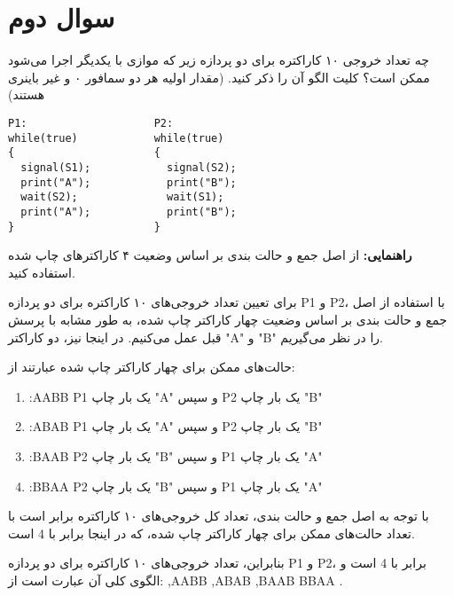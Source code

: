\section{سوال دوم}

چه تعداد خروجی ۱۰ کاراکتره برای دو پردازه زیر که موازی با یکدیگر اجرا می‌شود ممکن است؟ کلیت الگو آن را ذکر کنید. (مقدار اولیه هر دو سمافور ۰ و غیر باینری هستند)


\begin{latin}
\begin{lstlisting}
P1:                    P2:
while(true)            while(true)
{                      {
  signal(S1);            signal(S2);
  print("A");            print("B");
  wait(S2);              wait(S1);
  print("A");            print("B");
}	                   }

\end{lstlisting}
\end{latin}

\textbf{راهنمایی:‌ }از اصل جمع و حالت بندی بر اساس وضعیت ۴ کاراکتر‌های چاپ شده استفاده کنید.

\begin{qsolve}
برای تعیین تعداد خروجی‌های ۱۰ کاراکتره برای دو پردازه P1 و P2، با استفاده از اصل جمع و حالت بندی بر اساس وضعیت چهار کاراکتر چاپ شده، به طور مشابه با پرسش قبل عمل می‌کنیم. در اینجا نیز، دو کاراکتر "A" و "B" را در نظر می‌گیریم.

حالت‌های ممکن برای چهار کاراکتر چاپ شده عبارتند از:
\begin{enumerate}
	\item :AABB P1 یک بار چاپ "A" و سپس P2 یک بار چاپ "B"
	\item :ABAB P1 یک بار چاپ "A" و سپس P2 یک بار چاپ "B"
	\item :BAAB P2 یک بار چاپ "B" و سپس P1 یک بار چاپ "A"
	\item :BBAA P2 یک بار چاپ "B" و سپس P1 یک بار چاپ "A"
\end{enumerate}

با توجه به اصل جمع و حالت بندی، تعداد کل خروجی‌های ۱۰ کاراکتره برابر است با تعداد حالت‌های ممکن برای چهار کاراکتر چاپ شده، که در اینجا برابر با 4 است.

بنابراین، تعداد خروجی‌های ۱۰ کاراکتره برای دو پردازه P1 و P2، برابر با 4 است و الگوی کلی آن عبارت است از: ,AABB ,ABAB ,BAAB BBAA
.

\end{qsolve}
